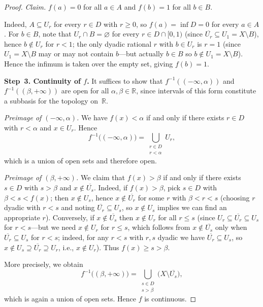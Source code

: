 \documentclass[11pt,a4paper,twoside]{book}
\theoremstyle{remark}
\theoremstyle{definition}
\theoremstyle{definition}
\begin{document}
\begin{proof}
\emph{Claim.}  $f(a)=0$ for all $a\in A$ and $f(b)=1$ for all $b\in B$.

Indeed, $A\subseteq U_r$ for every $r\in D$ with $r\ge 0$, so
$f(a)=\inf D =0$ for every $a\in A$.  For $b\in B$, note that
$U_r\cap B=\varnothing$ for every $r\in D\cap[0,1)$ (since
$\overline{U_r}\subseteq U_1 = X\setminus B$), hence $b\notin U_r$
for $r<1$; the only dyadic rational $r$ with $b\in U_r$ is $r=1$
(since $U_1=X\setminus B$ may or may not contain $b$---but actually
$b\in B$ so $b\notin U_1=X\setminus B$).  Hence the infimum is taken
over the empty set, giving $f(b)=1$.

\medskip
\textbf{Step~3.  Continuity of $f$.}
It suffices to show that $f^{-1}((-\infty,\alpha))$ and
$f^{-1}((\beta,+\infty))$ are open for all $\alpha,\beta\in\mathbb{R}$,
since intervals of this form constitute a subbasis for the topology
on~$\mathbb{R}$.

\emph{Preimage of $(-\infty,\alpha)$.}
We have $f(x)<\alpha$ if and only if there exists $r\in D$ with
$r<\alpha$ and $x\in U_r$.  Hence
\[
  f^{-1}\bigl((-\infty,\alpha)\bigr)
  = \bigcup_{\substack{r\in D \\ r<\alpha}} U_r,
\]
which is a union of open sets and therefore open.

\emph{Preimage of $(\beta,+\infty)$.}
We claim that $f(x)>\beta$ if and only if there exists $s\in D$ with
$s>\beta$ and $x\notin\overline{U_s}$.  Indeed, if $f(x)>\beta$, pick
$s\in D$ with $\beta<s<f(x)$; then $x\notin U_s$, hence
$x\notin\overline{U_r}$ for some $r$ with $\beta<r<s$ (choosing $r$
dyadic with $r<s$ and noting
$\overline{U_r}\subseteq U_s$, so $x\notin U_s$ implies we can find
an appropriate $r$).  Conversely, if $x\notin\overline{U_s}$ then
$x\notin U_r$ for all $r\le s$ (since $U_r\subseteq\overline{U_r}
\subseteq U_s$ for $r<s$---but we need $x\notin U_r$ for $r\le s$,
which follows from $x\notin\overline{U_s}$ only when
$\overline{U_r}\subseteq U_s$ for $r<s$; indeed, for any $r<s$ with
$r,s$ dyadic we have $\overline{U_r}\subseteq U_s$, so
$x\notin U_s\supseteq\overline{U_r}\supseteq U_r$, i.e.,
$x\notin U_r$).  Thus $f(x)\ge s>\beta$.

More precisely, we obtain
\[
  f^{-1}\bigl((\beta,+\infty)\bigr)
  = \bigcup_{\substack{s\in D \\ s>\beta}}
    \bigl(X\setminus\overline{U_s}\bigr),
\]
which is again a union of open sets.  Hence $f$ is continuous.
\end{proof}
\end{document}
